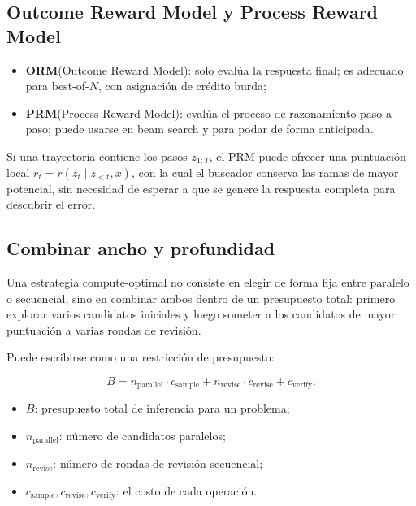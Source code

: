 \documentclass[a4paper]{article}
\begin{document}
\subsection{Outcome Reward Model y Process Reward Model}


\begin{itemize}
    \item \textbf{ORM}(Outcome Reward Model): solo evalúa la respuesta final; es adecuado para best-of-$N$, con asignación de crédito burda;
    \item \textbf{PRM}(Process Reward Model): evalúa el proceso de razonamiento paso a paso; puede usarse en beam search y para podar de forma anticipada.
\end{itemize}

Si una trayectoria contiene los pasos $z_{1:T}$, el PRM puede ofrecer una puntuación local $r_t=r(z_t\mid z_{<t},x)$, con la cual el buscador conserva las ramas de mayor potencial, sin necesidad de esperar a que se genere la respuesta completa para descubrir el error.

\subsection{Combinar ancho y profundidad}

Una estrategia compute-optimal no consiste en elegir de forma fija entre paralelo o secuencial, sino en combinar ambos dentro de un presupuesto total: primero explorar varios candidatos iniciales y luego someter a los candidatos de mayor puntuación a varias rondas de revisión.


Puede escribirse como una restricción de presupuesto:

$$
B=n_{\mathrm{parallel}}\cdot c_{\mathrm{sample}}
+n_{\mathrm{revise}}\cdot c_{\mathrm{revise}}
+c_{\mathrm{verify}}.
$$

\begin{itemize}
    \item $B$: presupuesto total de inferencia para un problema;
    \item $n_{\mathrm{parallel}}$: número de candidatos paralelos;
    \item $n_{\mathrm{revise}}$: número de rondas de revisión secuencial;
    \item $c_{\mathrm{sample}},c_{\mathrm{revise}},c_{\mathrm{verify}}$: el costo de cada operación.
\end{itemize}
\end{document}
